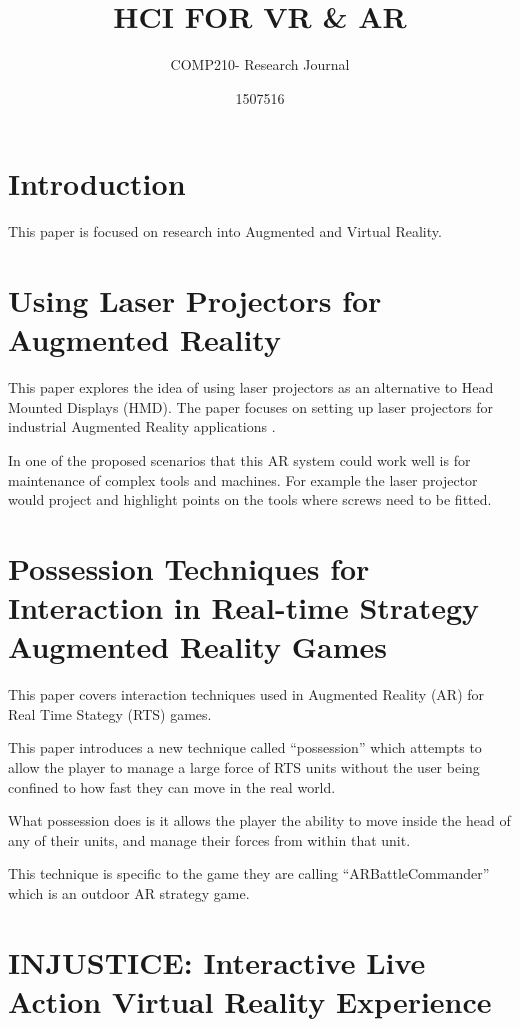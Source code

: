 \documentclass{scrartcl}
\title{HCI FOR VR \& AR}
\subtitle{COMP210- Research Journal}
\author{1507516}
\begin{document}
\maketitle

\abstract{}


\section{Introduction}
This paper is focused on research into Augmented and Virtual Reality.

\cite{nielsen1990heuristic}

\section {Using Laser Projectors for Augmented Reality\cite{Schwerdtfeger:2008}}

This paper explores the idea of using laser projectors as an alternative to Head Mounted Displays (HMD).
The paper focuses on setting up laser projectors for industrial Augmented Reality applications \cite{Schwerdtfeger:2008}.

In one of the proposed scenarios that this AR system could work well is for maintenance of complex tools and machines. For example the laser projector would project and highlight points on the tools where screws need to be fitted.

\section {Possession Techniques for Interaction in Real-time Strategy Augmented Reality Games \cite{Phillips:2005}}
This paper covers interaction techniques used in Augmented Reality (AR) for Real Time Stategy (RTS) games.

This paper introduces a new technique called ``possession'' which attempts to allow the player to manage a large force of RTS units without the user being confined to how fast they can move in the real world.

What possession does is it allows the player the ability to move inside the head of any of their units,  and manage their forces from within that unit. 

This technique is specific to the game they are calling ``ARBattleCommander'' which is an outdoor AR strategy game.


\section{ INJUSTICE: Interactive Live Action Virtual Reality Experience \cite{Cho:2016}}
\end{document}
